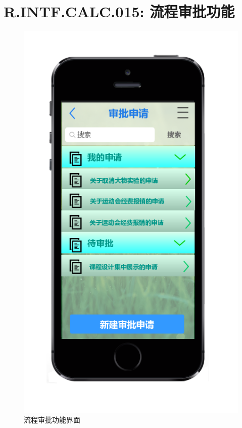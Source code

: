     \section{\color{red}R.INTF.CALC.015: 流程审批功能}
    \begin{figure}[h]
        \centering
        \includegraphics[scale=0.6]{OutlineDesign/figures/流程审批功能界面.png}
        \caption{\color{red}流程审批功能界面}
        \label{fig:server_flow}
    \end{figure}
    \newpage
